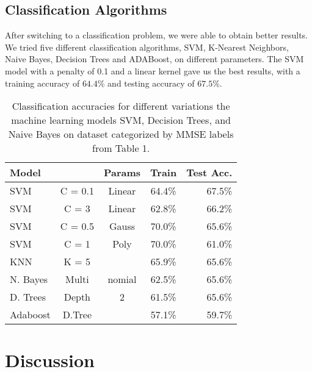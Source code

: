 \documentclass{article}
\begin{document}
\subsection{Classification Algorithms}
After switching to a classification problem, we were able to obtain better results. We tried five different classification algorithms, SVM, K-Nearest Neighbors, Naive Bayes, Decision Trees and ADABoost, on different parameters. The SVM  model with a penalty of 0.1 and a linear kernel gave us the best results, with a training accuracy of $64.4\%$ and testing accuracy of $67.5\%$. 
\begin{table}[h]
\caption{Classification accuracies for different variations the machine learning models SVM, Decision Trees, and Naive Bayes on dataset categorized by MMSE labels from Table 1.}
\label{sample-table}
\vskip 0.15in
\begin{center}
\begin{small}
\begin{sc}
\begin{tabular}{lcccr}
\hline
\abovespace\belowspace
Model & & Params & Train & Test Acc. \\
\hline
\abovespace
SVM    & C = 0.1 & Linear & 64.4\% & 67.5\% \\
SVM    & C = 3 & Linear & 62.8\% & 66.2\% \\
SVM    & C = 0.5 & Gauss & 70.0\% & 65.6\% \\
SVM    & C = 1 & Poly & 70.0\% & 61.0\% \\
KNN    & K = 5 && 65.9\% & 65.6\% \\
N. Bayes    &Multi & nomial & 62.5\% & 65.6\% \\
D. Trees    &Depth & 2 & 61.5\% & 65.6\% \\
\belowspace
Adaboost    & D.Tree  &  & 57.1\% & 59.7\% \\
\hline
\end{tabular}
\end{sc}
\end{small}
\end{center}
\vskip -0.1in
\end{table}

\section{Discussion}
\end{document}
